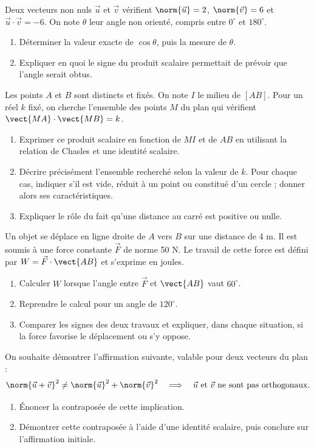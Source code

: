 Deux vecteurs non nuls $\vec u$ et $\vec v$ vérifient $\norm{\vec u}=2$, $\norm{\vec v}=6$ et $\vec u\cdot\vec v=-6$. On note $\theta$ leur angle non orienté, compris entre $0^\circ$ et $180^\circ$.
\begin{enumerate}[label=\arabic*.]
\item Déterminer la valeur exacte de $\cos\theta$, puis la mesure de $\theta$.
\item Expliquer en quoi le signe du produit scalaire permettait de prévoir que l’angle serait obtus.
\end{enumerate}
Les points $A$ et $B$ sont distincts et fixés. On note $I$ le milieu de $[AB]$. Pour un réel $k$ fixé, on cherche l’ensemble des points $M$ du plan qui vérifient $\vect{MA}\cdot\vect{MB}=k$.
\begin{enumerate}[label=\arabic*.]
\item Exprimer ce produit scalaire en fonction de $MI$ et de $AB$ en utilisant la relation de Chasles et une identité scalaire.
\item Décrire précisément l’ensemble recherché selon la valeur de $k$. Pour chaque cas, indiquer s’il est vide, réduit à un point ou constitué d’un cercle ; donner alors ses caractéristiques.
\item Expliquer le rôle du fait qu’une distance au carré est positive ou nulle.
\end{enumerate}
Un objet se déplace en ligne droite de $A$ vers $B$ sur une distance de 4 m. Il est soumis à une force constante $\vec F$ de norme 50 N. Le travail de cette force est défini par $W=\vec F\cdot\vect{AB}$ et s’exprime en joules.
\begin{enumerate}[label=\arabic*.]
\item Calculer $W$ lorsque l’angle entre $\vec F$ et $\vect{AB}$ vaut $60^\circ$.
\item Reprendre le calcul pour un angle de $120^\circ$.
\item Comparer les signes des deux travaux et expliquer, dans chaque situation, si la force favorise le déplacement ou s’y oppose.
\end{enumerate}
On souhaite démontrer l’affirmation suivante, valable pour deux vecteurs du plan :\[\norm{\vec u+\vec v}^2\ne\norm{\vec u}^2+\norm{\vec v}^2\quad\Longrightarrow\quad \vec u\text{ et }\vec v\text{ ne sont pas orthogonaux}.\]
\begin{enumerate}[label=\arabic*.]
\item Énoncer la contraposée de cette implication.
\item Démontrer cette contraposée à l’aide d’une identité scalaire, puis conclure sur l’affirmation initiale.
\end{enumerate}
